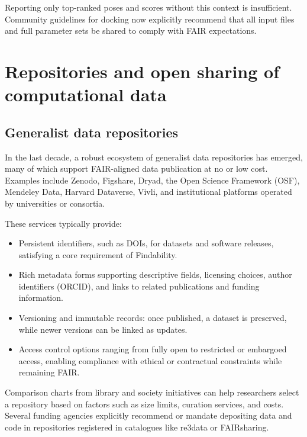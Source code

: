 \documentclass[12pt]{article}
\begin{document}
Reporting only top-ranked poses and scores without this context is insufficient. Community guidelines for docking now explicitly recommend that all input files and full parameter sets be shared to comply with FAIR expectations.\cite{CH12_plos2025tenDocking}

\section{Repositories and open sharing of computational data}

\subsection{Generalist data repositories}

In the last decade, a robust ecosystem of generalist data repositories has emerged, many of which support FAIR-aligned data publication at no or low cost. Examples include Zenodo, Figshare, Dryad, the Open Science Framework (OSF), Mendeley Data, Harvard Dataverse, Vivli, and institutional platforms operated by universities or consortia.\cite{CH12_uTexasRepos,CH12_aguRepos,CH12_snsfRepos} 

These services typically provide:

\begin{itemize}
  \item Persistent identifiers, such as DOIs, for datasets and software releases, satisfying a core requirement of Findability.
  \item Rich metadata forms supporting descriptive fields, licensing choices, author identifiers (ORCID), and links to related publications and funding information.
  \item Versioning and immutable records: once published, a dataset is preserved, while newer versions can be linked as updates.
  \item Access control options ranging from fully open to restricted or embargoed access, enabling compliance with ethical or contractual constraints while remaining FAIR.
\end{itemize}

Comparison charts from library and society initiatives can help researchers select a repository based on factors such as size limits, curation services, and costs.\cite{CH12_aguRepos,CH12_uMassOpenData} Several funding agencies explicitly recommend or mandate depositing data and code in repositories registered in catalogues like re3data or FAIRsharing.\cite{CH12_publisherReqs,CH12_helpingFAIR2019}
\end{document}

